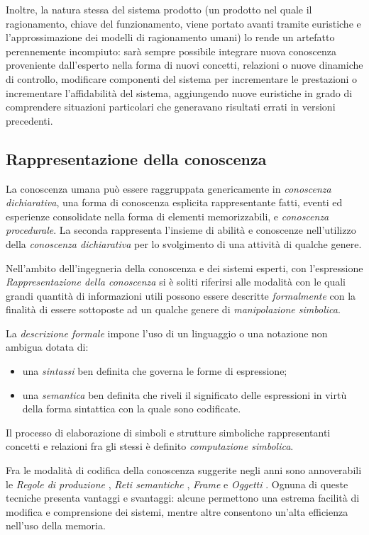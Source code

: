Inoltre, la natura stessa del sistema prodotto (un prodotto nel quale il ragionamento, chiave del funzionamento, viene portato avanti tramite euristiche e l'approssimazione dei modelli di ragionamento umani) lo rende un artefatto perennemente incompiuto: sarà sempre possibile integrare nuova conoscenza proveniente dall'esperto nella forma di nuovi concetti, relazioni o nuove dinamiche di controllo, modificare componenti del sistema per incrementare le prestazioni o incrementare l'affidabilità del sistema, aggiungendo nuove euristiche in grado di comprendere situazioni particolari che generavano risultati errati in versioni precedenti.

\subsection{Rappresentazione della conoscenza}

La conoscenza umana può essere raggruppata genericamente in \emph{conoscenza dichiarativa}, una forma di conoscenza esplicita rappresentante fatti, eventi ed esperienze consolidate nella forma di elementi memorizzabili, e \emph{conoscenza procedurale}. La seconda rappresenta l'insieme di abilità e conoscenze nell'utilizzo della \emph{conoscenza dichiarativa} per lo svolgimento di una attività di qualche genere.


Nell'ambito dell'ingegneria della conoscenza e dei sistemi esperti, con l'espressione \emph{Rappresentazione della conoscenza} si è soliti riferirsi alle modalità con le quali grandi quantità di informazioni utili possono essere descritte \emph{formalmente} con la finalità di essere sottoposte ad un qualche genere di \emph{manipolazione simbolica}. \cite{jackson1999}

La \emph{descrizione formale} impone l'uso di un linguaggio o una notazione non ambigua dotata di:
\begin{itemize}
	\item una \emph{sintassi} ben definita che governa le forme di espressione;
	\item una \emph{semantica} ben definita che riveli il significato delle espressioni in virtù della forma sintattica con la quale sono codificate.
\end{itemize}

Il processo di elaborazione di simboli e strutture simboliche rappresentanti concetti e relazioni fra gli stessi è definito \emph{computazione simbolica}.

Fra le modalità di codifica della conoscenza suggerite negli anni sono annoverabili le \emph{Regole di produzione} \cite{davisking1975}, \emph{Reti semantiche} \cite{richens1956}, \emph{Frame} \cite{minsky1974} e \emph{Oggetti} \cite{holsapple1994object} \cite{holsapple1994operations}. Ognuna di queste tecniche presenta vantaggi e svantaggi: alcune permettono una estrema facilità di modifica e comprensione dei sistemi, mentre altre consentono un'alta efficienza nell'uso della memoria.

